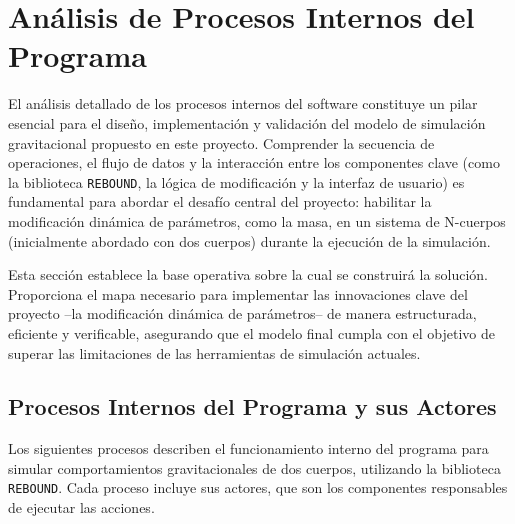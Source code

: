\section{Análisis de Procesos Internos del Programa}

El análisis detallado de los procesos internos del software constituye un pilar esencial para el diseño, implementación y validación del modelo de simulación gravitacional propuesto en este proyecto. Comprender la secuencia de operaciones, el flujo de datos y la interacción entre los componentes clave (como la biblioteca \texttt{REBOUND}, la lógica de modificación y la interfaz de usuario) es fundamental para abordar el desafío central del proyecto: habilitar la modificación dinámica de parámetros, como la masa, en un sistema de N-cuerpos (inicialmente abordado con dos cuerpos) durante la ejecución de la simulación.

Esta sección establece la base operativa sobre la cual se construirá la solución. Proporciona el mapa necesario para implementar las innovaciones clave del proyecto –la modificación dinámica de parámetros– de manera estructurada, eficiente y verificable, asegurando que el modelo final cumpla con el objetivo de superar las limitaciones de las herramientas de simulación actuales.

\subsection{Procesos Internos del Programa y sus Actores}

Los siguientes procesos describen el funcionamiento interno del programa para simular comportamientos gravitacionales de dos cuerpos, utilizando la biblioteca \texttt{REBOUND}. Cada proceso incluye sus actores, que son los componentes responsables de ejecutar las acciones.

